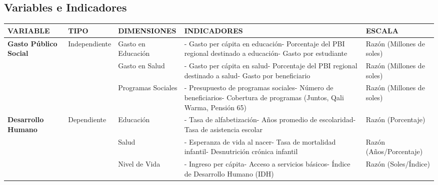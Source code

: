 \documentclass[
  man,
  floatsintext,
  longtable,
  a4paper,
  nolmodern,
  notxfonts,
  notimes,
  12pt,
  colorlinks=true,linkcolor=blue,citecolor=blue,urlcolor=blue]{apa7}
\newcounter{none} %
\begin{document}
\subsection{Variables e Indicadores}\label{variables-e-indicadores}

{\def\LTcaptype{none} %
\begin{longtable}[]{@{}
  >{\raggedright\arraybackslash}p{}
  >{\raggedright\arraybackslash}p{}
  >{\raggedright\arraybackslash}p{}
  >{\raggedright\arraybackslash}p{}
  >{\raggedright\arraybackslash}p{}@{}}
\toprule\noalign{}
\begin{minipage}[b]{\linewidth}\raggedright
VARIABLE
\end{minipage} & \begin{minipage}[b]{\linewidth}\raggedright
TIPO
\end{minipage} & \begin{minipage}[b]{\linewidth}\raggedright
DIMENSIONES
\end{minipage} & \begin{minipage}[b]{\linewidth}\raggedright
INDICADORES
\end{minipage} & \begin{minipage}[b]{\linewidth}\raggedright
ESCALA
\end{minipage} \\
\midrule\noalign{}
\endhead
\bottomrule\noalign{}
\endlastfoot
\textbf{Gasto Público Social} & Independiente & Gasto en Educación & -
Gasto per cápita en educación- Porcentaje del PBI regional destinado a
educación- Gasto por estudiante & Razón (Millones de soles) \\
& & Gasto en Salud & - Gasto per cápita en salud- Porcentaje del PBI
regional destinado a salud- Gasto por beneficiario & Razón (Millones de
soles) \\
& & Programas Sociales & - Presupuesto de programas sociales- Número de
beneficiarios- Cobertura de programas (Juntos, Qali Warma, Pensión 65) &
Razón (Millones de soles) \\
\textbf{Desarrollo Humano} & Dependiente & Educación & - Tasa de
alfabetización- Años promedio de escolaridad- Tasa de asistencia escolar
& Razón (Porcentaje) \\
& & Salud & - Esperanza de vida al nacer- Tasa de mortalidad infantil-
Desnutrición crónica infantil & Razón (Años/Porcentaje) \\
& & Nivel de Vida & - Ingreso per cápita- Acceso a servicios básicos-
Índice de Desarrollo Humano (IDH) & Razón (Soles/Índice) \\
\end{longtable}
}
\end{document}
